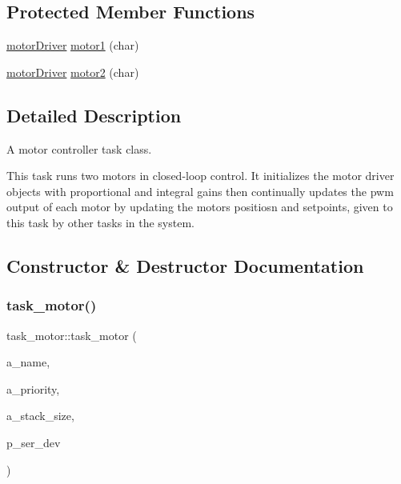 \subsection*{Protected Member Functions}
\begin{DoxyCompactItemize}
\item 
\mbox{\hyperlink{classmotorDriver}{motor\+Driver}} \mbox{\hyperlink{classtask__motor_afd5f8a54a30721c373339114f52d765a}{motor1}} (char)
\item 
\mbox{\hyperlink{classmotorDriver}{motor\+Driver}} \mbox{\hyperlink{classtask__motor_a91c4ef4950c8a17763c56fe1be988e03}{motor2}} (char)
\end{DoxyCompactItemize}


\subsection{Detailed Description}
A motor controller task class. 

This task runs two motors in closed-\/loop control. It initializes the motor driver objects with proportional and integral gains then continually updates the pwm output of each motor by updating the motors\textquotesingle{} positiosn and setpoints, given to this task by other tasks in the system. 

\subsection{Constructor \& Destructor Documentation}
\mbox{\label{classtask__motor_a6ed0a0b463e698d636b28bcdd518a027}} 
\subsubsection{\texorpdfstring{task\_motor()}{task\_motor()}}
{\footnotesize\ttfamily task\+\_\+motor\+::task\+\_\+motor (\begin{DoxyParamCaption}\item[{const char $\ast$}]{a\+\_\+name,  }\item[{unsigned port\+B\+A\+S\+E\+\_\+\+T\+Y\+PE}]{a\+\_\+priority,  }\item[{size\+\_\+t}]{a\+\_\+stack\+\_\+size,  }\item[{emstream $\ast$}]{p\+\_\+ser\+\_\+dev }\end{DoxyParamCaption})}



